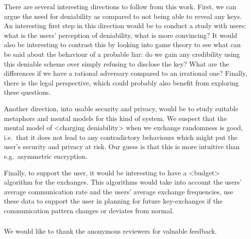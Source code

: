 There are several interesting directions to follow from this work.
First, we can argue the need for deniability as compared to not being able to 
reveal any keys.
An interesting first step in this direction would be to conduct a study with 
users: what is the users' perception of deniability, what is more convincing?
It would also be interesting to contrast this by looking into game theory to 
see what can be said about the behaviour of a probable liar: do we gain any 
credibility using this deniable scheme over simply refusing to disclose the 
key?
What are the differences if we have a rational adversary compared to an 
irrational one?
Finally, there is the legal perspective, which could probably also benefit from 
exploring these questions.

Another direction, into usable security and privacy, would be to study suitable 
metaphors and mental models for this kind of system.
We suspect that the mental model of <charging deniability> when we exchange 
randomness is good, i.e.~that it does not lead to any contradictory behaviours 
which might put the user's security and privacy at risk.
Our guess is that this is more intuitive than e.g.~asymmetric encryption.

Finally, to support the user, it would be interesting to have a <budget> 
algorithm for the exchanges.
This algorithms would take into account the users' average communication rate 
and the users' average exchange frequencies, use these data to support the user 
in planning for future key-exchanges if the communication pattern changes or 
deviates from normal.


\subsubsection*{\ackname}

We would like to thank the anonymous reviewers for valuable feedback.


\printbibliography{}

